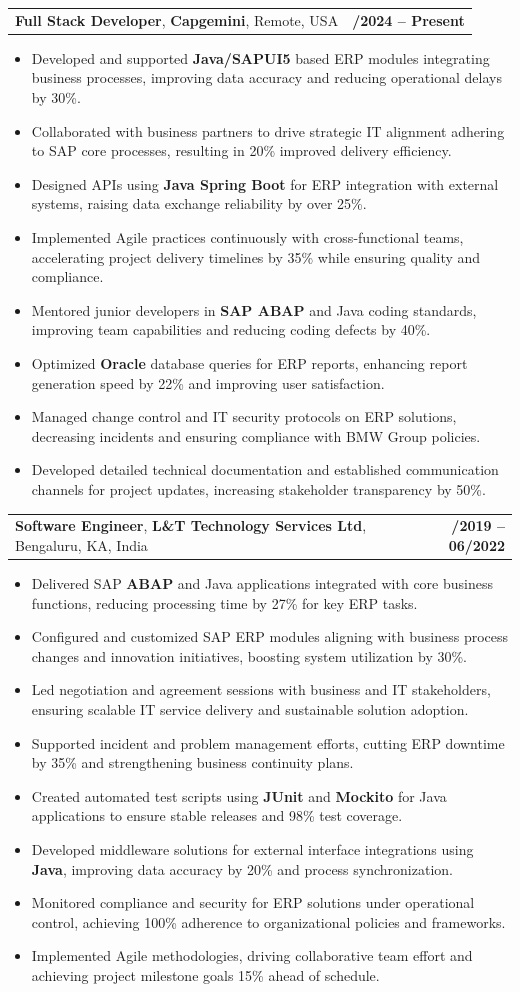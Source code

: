 \documentclass[letterpaper,11pt]{article}
\makeatletter
\newcommand{\resumeItem}[1]{
  \item\footnotesize{
    {#1 \vspace{-2pt}}
  }
}
\newcommand{\resumeSubheading}[4]{
  \vspace{-2pt}\item
    \begin{tabular*}{1.0\textwidth}[t]{l@{\extracolsep{\fill}}r}
      \textbf{\fontsize{10pt}{14pt}\selectfont #3}, \textbf{\fontsize{10pt}{14pt}\selectfont #1}, \fontsize{10pt}{14pt}\selectfont #4 & \textbf{\fontsize{10pt}{14pt}\selectfont #2} \\
    \end{tabular*}\vspace{-7pt}
}
\newcommand{\resumeItemListStart}{\begin{itemize}[leftmargin=*]}
\newcommand{\resumeItemListEnd}{\end{itemize}\vspace{-5pt}}
\makeatother
\begin{document}
    \resumeSubheading
        {Capgemini}{01/2024 -- Present}
        {Full Stack Developer}{Remote, USA}
      \resumeItemListStart
        \resumeItem{Developed and supported \textbf{Java/SAPUI5} based ERP modules integrating business processes, improving data accuracy and reducing operational delays by 30\%.}
        \resumeItem{Collaborated with business partners to drive strategic IT alignment adhering to SAP core processes, resulting in 20\% improved delivery efficiency.}
        \resumeItem{Designed APIs using \textbf{Java Spring Boot} for ERP integration with external systems, raising data exchange reliability by over 25\%.}
        \resumeItem{Implemented Agile practices continuously with cross-functional teams, accelerating project delivery timelines by 35\% while ensuring quality and compliance.}
        \resumeItem{Mentored junior developers in \textbf{SAP ABAP} and Java coding standards, improving team capabilities and reducing coding defects by 40\%.}
        \resumeItem{Optimized \textbf{Oracle} database queries for ERP reports, enhancing report generation speed by 22\% and improving user satisfaction.}
        \resumeItem{Managed change control and IT security protocols on ERP solutions, decreasing incidents and ensuring compliance with BMW Group policies.}
        \resumeItem{Developed detailed technical documentation and established communication channels for project updates, increasing stakeholder transparency by 50\%.}
      \resumeItemListEnd

    \resumeSubheading
        {L\&T Technology Services Ltd}{08/2019 -- 06/2022}
        {Software Engineer}{Bengaluru, KA, India}
      \resumeItemListStart
        \resumeItem{Delivered SAP \textbf{ABAP} and Java applications integrated with core business functions, reducing processing time by 27\% for key ERP tasks.}
        \resumeItem{Configured and customized SAP ERP modules aligning with business process changes and innovation initiatives, boosting system utilization by 30\%.}
        \resumeItem{Led negotiation and agreement sessions with business and IT stakeholders, ensuring scalable IT service delivery and sustainable solution adoption.}
        \resumeItem{Supported incident and problem management efforts, cutting ERP downtime by 35\% and strengthening business continuity plans.}
        \resumeItem{Created automated test scripts using \textbf{JUnit} and \textbf{Mockito} for Java applications to ensure stable releases and 98\% test coverage.}
        \resumeItem{Developed middleware solutions for external interface integrations using \textbf{Java}, improving data accuracy by 20\% and process synchronization.}
        \resumeItem{Monitored compliance and security for ERP solutions under operational control, achieving 100\% adherence to organizational policies and frameworks.}
        \resumeItem{Implemented Agile methodologies, driving collaborative team effort and achieving project milestone goals 15\% ahead of schedule.}
      \resumeItemListEnd
\end{document}
